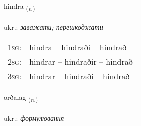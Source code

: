 \documentclass[frontgrid, backgrid]{flacards}\usepackage[]{graphicx}\usepackage[]{xcolor}
\begin{document}
\renewcommand{\flhead}{\vskip5pt \fboxsep=0pt {\small\bfseries\footnotesize Sagnorð | дієслово}}
\renewcommand{\fcfoot}{\vskip5pt \fboxsep=0pt \hspace{2pt}{\small\bfseries\footnotesize 3K}}

\renewcommand{\blhead}{\vskip5pt {\small\bfseries\footnotesize Sagnorð | дієслово }}
\renewcommand{\bcfoot}{\vskip5pt \hspace{2pt}{\small\bfseries\footnotesize 3K}}


{hindra \small{\textsubscript{(\textit{v.})}} \\[1ex] %
\textphonetic{[hɪntra]} \\
ukr.: \emph{заважати; перешкоджати} \\  [2ex]
\renewcommand*{\arraystretch}{0.8}
\begin{tabular}{p{1cm}l}
\textsc{1sg}: & hindra -- hindraði -- hindrað \\ 
\textsc{2sg}: & hindrar -- hindraðir -- hindrað \\ 
\textsc{3sg}: & hindrar -- hindraði -- hindrað \\ 
\end{tabular}
}

\renewcommand{\flhead}{\vskip5pt \fboxsep=0pt {\small\bfseries\footnotesize Nafnorð | іменник}}
\renewcommand{\fcfoot}{\vskip5pt \fboxsep=0pt \hspace{2pt}{\small\bfseries\footnotesize 3K}}

\renewcommand{\blhead}{\vskip5pt {\small\bfseries\footnotesize Nafnorð | іменник }}
\renewcommand{\bcfoot}{\vskip5pt \hspace{2pt}{\small\bfseries\footnotesize 3K}}


{orðalag \small{\textsubscript{(\textit{n.})}} \\[1ex] %
\textphonetic{[ɔrðalaɣ]} \\
ukr.: \emph{формулювання} \\  [2ex]
\renewcommand*{\arraystretch}{0.8}
}
\end{document}
